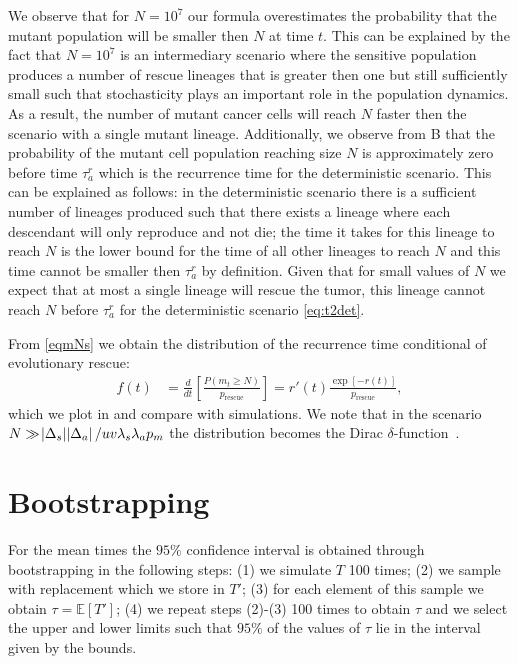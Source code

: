 \documentclass[12pt]{extarticle}
\newcommand{\presc}{p_\text{rescue}}
\begin{document}
\begin{appendices}
We observe that for $N=10^7$ our formula overestimates the probability that the mutant population will be smaller then $N$ at time $t$.  This can be explained by the fact that $N=10^7$ is an intermediary scenario where the sensitive population produces a number of rescue lineages that is greater then one but still sufficiently small such that stochasticity plays an important role in the population dynamics. As a result, the number of mutant cancer cells will reach $N$ faster then the scenario with a single mutant lineage. Additionally, we observe from B that the probability of the mutant cell population reaching size $N$ is approximately zero before time $\tau_a^r$ which is the recurrence time for the deterministic scenario. This can be explained as follows: in the deterministic scenario there is a sufficient number of lineages produced such that there exists a lineage where each descendant will only reproduce and not die; the time it takes for this lineage to reach $N$ is the lower bound for the time of all other lineages to reach $N$ and this time cannot be smaller then $\tau_a^r$ by definition. Given that for small values of $N$ we expect that at most a single lineage will rescue the tumor, this lineage cannot reach $N$ before $\tau_a^r$ for the deterministic scenario \cref{eq:t2det}.

From  \cref{eqmNs} we obtain the distribution of the recurrence time conditional of evolutionary rescue: %
\begin{align}\label{distribution}
f\left(t\right)&=\frac{d}{dt}\left[\frac{P\left(m_t\geq N\right)}{\presc}\right]=r'\left(t\right)\frac{\exp\left[-r\left(t\right)\right]}{\presc},
\end{align}
which we plot in  and compare with simulations. We note that in the scenario $N\gg\abs{\Delta_s}\abs{\Delta_a}/uv\lambda_s\lambda_ap_m$ the distribution becomes the Dirac $\delta$-function~\citep{barton1989elements}.
\section{Bootstrapping}
For the mean times the $95\%$ confidence interval is obtained through bootstrapping in the following steps: (1) we simulate $T$ 100 times; (2) we sample with replacement which we store in $T'$; (3) for each element of this sample we obtain $\tau=\mathbb{E}\left[T'\right]$; (4) we repeat steps (2)-(3) 100 times to obtain $\tau$ and we select the upper and lower limits such that $95\%$ of the values of $\tau$ lie in the interval given by the bounds.


\end{appendices}
\end{document}

